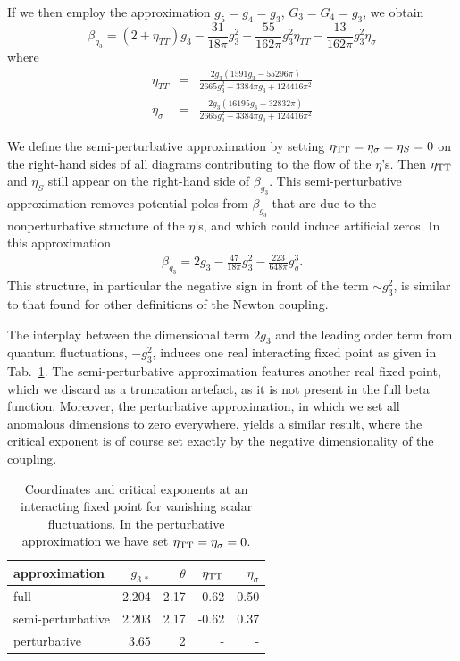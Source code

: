 \documentclass[11pt]{book} %
\newcommand{\be}{\begin{equation}}
\newcommand{\ee}{\end{equation}}
\newcommand{\bea}{\begin{eqnarray}}
\newcommand{\eea}{\end{eqnarray}}
\begin{document}
If we then employ the approximation $g_5 = g_4 = g_3$, $G_3 = G_4 = g_3$, we obtain
\be
\beta_{g_3}= (2+\eta_{TT})g_3
- \frac{31}{18 \pi}g_3^2
+\frac{55}{162\pi}g_3^2\eta_{TT}
-\frac{13}{162\pi}g_3^2\eta_\sigma
\ee
where
\bea
\eta_{TT}&=&\frac{2g_3(1591 g_3-55296 \pi)}{2665 g_3^2-3384\pi g_3 +124416 \pi^2}
\\
\eta_\sigma&=&\frac{2g_3(16195 g_3+32832 \pi)}{2665 g_3^2-3384\pi g_3 +124416 \pi^2}
\eea

We  define the semi-perturbative approximation by setting
$\eta_{\rm TT}= \eta_{\sigma}=\eta_S = 0$ on the right-hand sides of all diagrams contributing
to the flow of the $\eta$'s.
Then $\eta_{\rm TT}$ and $\eta_S$ still appear on the right-hand side of $\beta_{g_3}$.
This semi-perturbative approximation removes potential poles from $\beta_{g_3}$ that are
due to the nonperturbative structure of the $\eta$'s, and which could induce artificial zeros.
In this approximation
\bea
\beta_{g_3}= 2g_3 - \frac{47}{18 \pi}g_3^2
-\frac{223}{648\pi}g_g^3.\label{purgravitysemipertbeta}
\eea
This structure, in particular the negative sign in front of the term $\sim g_3^2$,
is similar to that found for other definitions of the Newton coupling.

The interplay between the dimensional term $2g_3$ and the leading order term from quantum fluctuations,
$- g_3^2$, induces one real interacting fixed point as given in Tab.~\ref{puregravityFP_table}.
The semi-perturbative approximation features another real fixed point,
which we discard as a truncation artefact, as it is not present in the full beta function.
Moreover, the perturbative approximation, in which we set all anomalous dimensions to zero everywhere,
yields a similar result, where the critical exponent is of course set exactly by the negative dimensionality
of the coupling.

\begin{table}[]
  \begin{center}
    \begin{tabular}{ l r r r r }
      \toprule
      approximation      & $g_{3\,\ast}$ & $\theta$ & $\eta_{\rm TT}$ & $\eta_{\sigma}$ \\
      \midrule
      full               & 2.204         & 2.17     & -0.62           & 0.50 \\
      semi-perturbative  & 2.203         & 2.17     & -0.62           & 0.37 \\
      perturbative       & 3.65          & 2        & -               & -    \\
      \bottomrule
    \end{tabular}
  \end{center}
  \caption{
    Coordinates and critical exponents at an interacting fixed point for vanishing scalar fluctuations.
    In the perturbative approximation we have set $\eta_{\rm TT}=\eta_{\sigma}=0$.
  }
  \label{puregravityFP_table}
\end{table}
\end{document}
